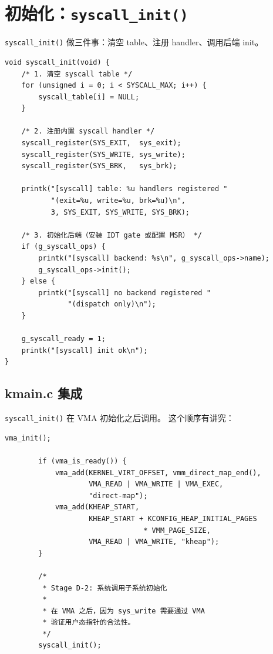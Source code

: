\section{初始化：\texttt{syscall\_init()}}
\label{sec:syscall-init}

\texttt{syscall\_init()} 做三件事：清空 table、注册 handler、调用后端 init。

\begin{lstlisting}[style=cstyle]
void syscall_init(void) {
    /* 1. 清空 syscall table */
    for (unsigned i = 0; i < SYSCALL_MAX; i++) {
        syscall_table[i] = NULL;
    }

    /* 2. 注册内置 syscall handler */
    syscall_register(SYS_EXIT,  sys_exit);
    syscall_register(SYS_WRITE, sys_write);
    syscall_register(SYS_BRK,   sys_brk);

    printk("[syscall] table: %u handlers registered "
           "(exit=%u, write=%u, brk=%u)\n",
           3, SYS_EXIT, SYS_WRITE, SYS_BRK);

    /* 3. 初始化后端（安装 IDT gate 或配置 MSR） */
    if (g_syscall_ops) {
        printk("[syscall] backend: %s\n", g_syscall_ops->name);
        g_syscall_ops->init();
    } else {
        printk("[syscall] no backend registered "
               "(dispatch only)\n");
    }

    g_syscall_ready = 1;
    printk("[syscall] init ok\n");
}
\end{lstlisting}

\subsection{kmain.c 集成}

\texttt{syscall\_init()} 在 VMA 初始化之后调用。
这个顺序有讲究：

\begin{lstlisting}[style=cstyle]
        vma_init();

        if (vma_is_ready()) {
            vma_add(KERNEL_VIRT_OFFSET, vmm_direct_map_end(),
                    VMA_READ | VMA_WRITE | VMA_EXEC,
                    "direct-map");
            vma_add(KHEAP_START,
                    KHEAP_START + KCONFIG_HEAP_INITIAL_PAGES
                                 * VMM_PAGE_SIZE,
                    VMA_READ | VMA_WRITE, "kheap");
        }

        /*
         * Stage D-2: 系统调用子系统初始化
         *
         * 在 VMA 之后，因为 sys_write 需要通过 VMA
         * 验证用户态指针的合法性。
         */
        syscall_init();
\end{lstlisting}

